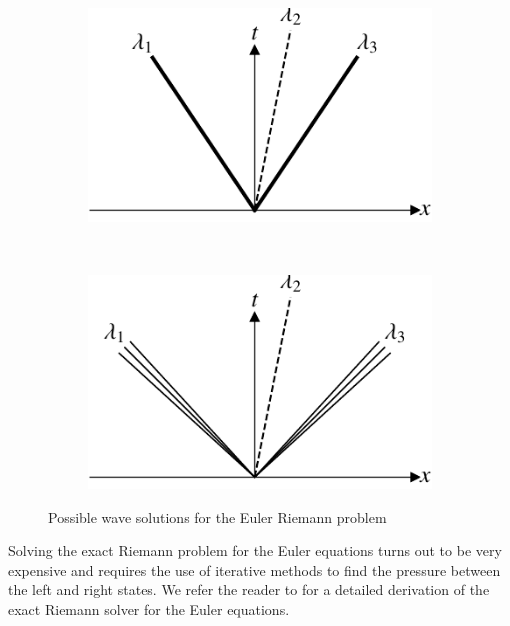 \begin{figure}[htb]
\begin{subfigure}[b]{0.35\linewidth}
		\includegraphics[width=\linewidth]{Pictures/euler_characteristics_2.pdf}
		\caption{}
	\end{subfigure}~
	\begin{subfigure}[b]{0.35\linewidth}
		\includegraphics[width=\linewidth]{Pictures/euler_characteristics_3.pdf}
		\caption{}
	\end{subfigure}
	\caption{Possible wave solutions for the Euler Riemann problem}
	\label{fig:euler_characteristics}
\end{figure}

Solving the exact Riemann problem for the Euler equations turns out to be very expensive and requires the use of iterative methods to find the pressure between the left and right states. We refer the reader to \cite{levequeFiniteVolumeMethods2002,toroRiemannSolversEvolved2006} for a detailed derivation of the exact Riemann solver for the Euler equations. 

